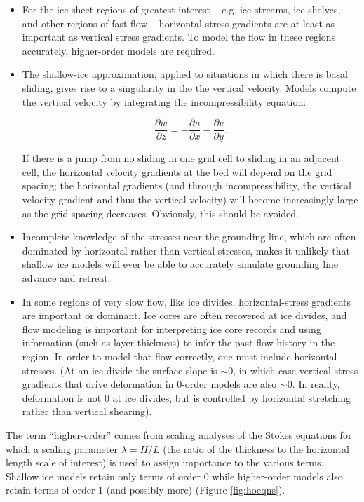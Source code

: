 \begin{itemize}
\item For the ice-sheet regions of greatest interest -- e.g. ice streams, ice shelves, and other regions of fast flow -- horizontal-stress gradients are at least as important as vertical stress gradients. To model the flow in these regions accurately, higher-order models are required.

\item The shallow-ice approximation, applied to situations in which there is basal sliding, gives rise to a singularity in the the vertical velocity. Models compute the vertical velocity by integrating the incompressibility equation:

\begin{equation}
  \label{ho.eq.incompress}
  \frac{\partial w}{\partial z} = -\frac{\partial u}{\partial x}-\frac{\partial v}{\partial y}.
\end{equation}

If there is a jump 
from no sliding in one grid cell to sliding in an adjacent cell, the horizontal velocity gradients at the bed will depend on the grid spacing; the horizontal gradients (and through incompressibility, the vertical velocity gradient and thus the vertical velocity) will become increasingly large as the grid spacing decreases. Obviously, this should be avoided.

\item Incomplete knowledge of the stresses near the grounding line, which are often dominated by horizontal rather than vertical stresses, makes it unlikely that shallow ice models will ever be able to accurately simulate grounding line advance and retreat.

\item In some regions of very slow flow, like ice divides, horizontal-stress gradients are important or dominant. Ice cores are often recovered at ice divides, and flow modeling is important for interpreting ice core records and using information (such as layer thickness) to infer the past flow history in the region. In order to model that flow correctly, one must include horizontal stresses. (At an ice divide the surface slope is \(\sim\)0, in which case vertical stress gradients that drive deformation in 0-order models are also \(\sim\)0. In reality, deformation is not 0 at ice divides, but is controlled by horizontal stretching rather than vertical shearing).
\end{itemize}

The term ``higher-order'' comes from scaling analyses of the Stokes equations for which a scaling parameter $\lambda=H/L$ (the ratio of the thickness to the horizontal length scale of interest) is used to assign importance to the various terms. Shallow ice models retain only terms of order 0 while higher-order models also retain terms of order 1 (and possibly more) (Figure \ref{fig:hoeqns}). 

